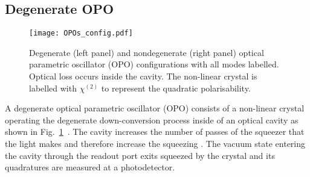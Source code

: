 \subsection{Degenerate OPO}

\begin{figure}
	\centering
	\texttt{[image: OPOs\_config.pdf]}
	\caption{ Degenerate (left panel) and nondegenerate (right panel) optical parametric oscillator (OPO) configurations with all modes labelled. Optical loss occurs inside the cavity. The non-linear crystal is labelled with $\chi^{(2)}$ to represent the quadratic polarisability. %
	}
	\label{fig:OPOs_config}
\end{figure}

A degenerate optical parametric oscillator (OPO) consists of a non-linear crystal operating the degenerate down-conversion process inside of an optical cavity as shown in Fig.~\ref{fig:OPOs_config}~\cite{}. The cavity increases the number of passes of the squeezer that the light makes and therefore increase the squeezing . The vacuum state entering the cavity through the readout port exits squeezed by the crystal and its quadratures are measured at a photodetector.

